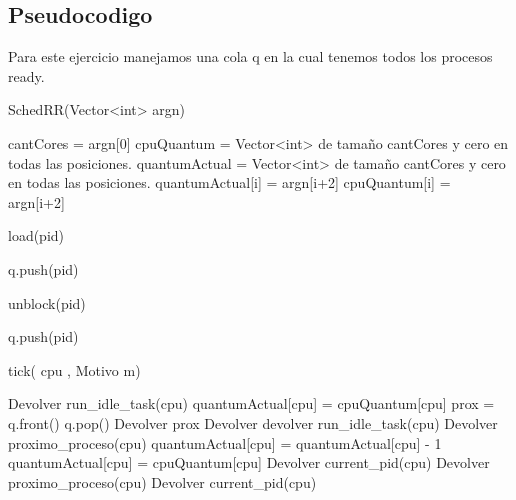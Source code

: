 \subsection{Pseudocodigo}

Para este ejercicio manejamos una cola q en la cual tenemos todos los procesos ready.




\begin{algorithm}[H]
\caption{SchedRR(Vector<int> argn)}
\label{pseudo:load}
\begin{algorithmic}

\STATE cantCores = argn[0]
\STATE cpuQuantum = Vector<int> de tamaño cantCores y cero en todas las posiciones.
\STATE quantumActual = Vector<int> de tamaño cantCores y cero en todas las posiciones.
	\STATE quantumActual[i] = argn[i+2]
	\STATE cpuQuantum[i] = argn[i+2]	
\ENDFOR

\end{algorithmic}
\end{algorithm}




\begin{algorithm}[H]
\caption{load(pid)}
\label{pseudo:load}
\begin{algorithmic}

\STATE q.push(pid)

\end{algorithmic}
\end{algorithm}

\begin{algorithm}[H]
\caption{unblock(pid)}
\label{pseudo:unblock}
\begin{algorithmic}

\STATE q.push(pid)

\end{algorithmic}
\end{algorithm}


\begin{algorithm}[H]
\caption{tick( cpu , Motivo m)}
\label{pseudo:tick}
\begin{algorithmic}

		\STATE Devolver run\_idle\_task(cpu)
	\ELSE
		\STATE quantumActual[cpu] = cpuQuantum[cpu]
		\STATE prox = q.front()
		\STATE q.pop()
		\STATE Devolver prox		
	\ENDIF
\ELSE
			\STATE Devolver devolver run\_idle\_task(cpu)
		\ELSE
			\STATE Devolver proximo\_proceso(cpu)
		\ENDIF
	\ELSE
		\STATE quantumActual[cpu] = quantumActual[cpu] - 1
				\STATE quantumActual[cpu] = cpuQuantum[cpu]
				\STATE Devolver current\_pid(cpu)
			\ELSE
				\STATE Devolver proximo\_proceso(cpu)
			\ENDIF
		\ELSE
			\STATE Devolver current\_pid(cpu)
		\ENDIF
	\ENDIF
	
 \ENDIF

\end{algorithmic}
\end{algorithm}


